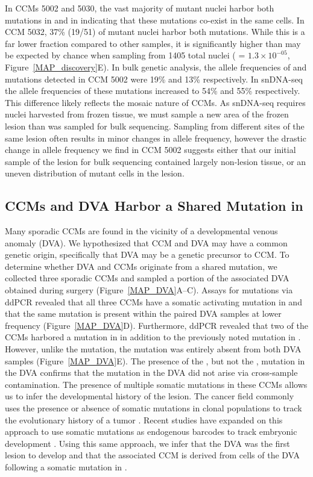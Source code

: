In CCMs 5002 and 5030, the vast majority of mutant nuclei harbor both mutations in  and in  indicating that these mutations co-exist in the same cells. In CCM 5032, 37\% (19/51) of mutant nuclei harbor both mutations. While this is a far lower fraction compared to other samples, it is significantly higher than may be expected by chance when sampling from 1405 total nuclei ( = $1.3\times10^{-05}$, Figure~\ref{MAP_discovery}E). In bulk genetic analysis, the allele frequencies of  and  mutations detected in CCM 5002 were 19\% and 13\% respectively. In snDNA-seq the allele frequencies of these mutations increased to 54\% and 55\% respectively. This difference likely reflects the mosaic nature of CCMs. As snDNA-seq requires nuclei harvested from frozen tissue, we must sample a new area of the frozen lesion than was sampled for bulk sequencing. Sampling from different sites of the same lesion often results in minor changes in allele frequency, however the drastic change in allele frequency we find in CCM 5002 suggests either that our initial sample of the lesion for bulk sequencing contained largely non-lesion tissue, or an uneven distribution of mutant cells in the lesion. 

\subsection{CCMs and DVA Harbor a Shared Mutation in  }

Many sporadic CCMs are found in the vicinity of a developmental venous anomaly (DVA). We hypothesized that CCM and DVA may have a common genetic origin, specifically that DVA may be a genetic precursor to CCM. To determine whether DVA and CCMs originate from a shared mutation, we collected three sporadic CCMs and sampled a portion of the associated DVA obtained during surgery (Figure~\ref{MAP_DVA}A--C). Assays for mutations via ddPCR revealed that all three CCMs have a somatic activating mutation in  and that the same mutation is present within the paired DVA samples at lower frequency (Figure~\ref{MAP_DVA}D). Furthermore, ddPCR revealed that two of the CCMs harbored a mutation in  in addition to the previously noted mutation in . However, unlike the  mutation, the  mutation was entirely absent from both DVA samples (Figure~\ref{MAP_DVA}E). The presence of the , but not the , mutation in the DVA confirms that the  mutation in the DVA did not arise via cross-sample contamination. The presence of multiple somatic mutations in these CCMs allows us to infer the developmental history of the lesion. The cancer field commonly uses the presence or absence of somatic mutations in clonal populations to track the evolutionary history of a tumor \citep{jiao2014, loo2018}. Recent studies have expanded on this approach to use somatic mutations as endogenous barcodes to track embryonic development \citep{bizzotto2021}. Using this same approach, we infer that the DVA was the first lesion to develop and that the associated CCM is derived from cells of the DVA following a somatic mutation in . 

